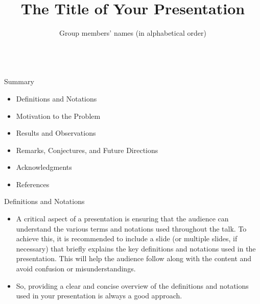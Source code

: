 \documentclass{beamer}
\title[Your Shor test]{The Title of Your Presentation}
\author{Group members’ names (in alphabetical order)\\ 
\\
}
\begin{document}
\begin{frame}
  \titlepage
\end{frame}
\begin{frame}{Summary}
    \begin{itemize}
        \item Definitions and Notations\bigskip
        
        \item Motivation to the Problem\bigskip
        
        \item Results and Observations\bigskip
        
        \item Remarks, Conjectures, and Future Directions\bigskip
        
        \item Acknowledgments\bigskip
        
        \item References
    \end{itemize}
\end{frame}
\begin{frame}{Definitions and Notations}
    \begin{itemize}
        \item[] A critical aspect of a presentation is ensuring that the audience can understand the various terms and notations used throughout the talk. To achieve this, it is recommended to include a slide (or multiple slides, if necessary) that briefly explains the key definitions and notations used in the presentation. This will help the audience follow along with the content and avoid confusion or misunderstandings. \medskip
        
        \item[] So, providing a clear and concise overview of the definitions and notations used in your presentation is always a good approach. 
    \end{itemize}
        
\end{frame}
\end{document}
